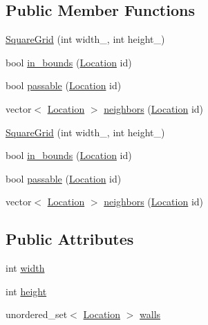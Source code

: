 \subsection*{Public Member Functions}
\begin{DoxyCompactItemize}
\item 
\mbox{\hyperlink{structSquareGrid_ae5debd1459b89aba9497f270f6d76d7b}{Square\+Grid}} (int width\+\_\+, int height\+\_\+)
\item 
bool \mbox{\hyperlink{structSquareGrid_a84bbaa9dad618228a2d6d3196254b86b}{in\+\_\+bounds}} (\mbox{\hyperlink{structSquareGrid_a2c9a2cbd3912aa48ac97289abc3f1c0f}{Location}} id)
\item 
bool \mbox{\hyperlink{structSquareGrid_a3f638b46510dd880823b1acac75c7b96}{passable}} (\mbox{\hyperlink{structSquareGrid_a2c9a2cbd3912aa48ac97289abc3f1c0f}{Location}} id)
\item 
vector$<$ \mbox{\hyperlink{structSquareGrid_a2c9a2cbd3912aa48ac97289abc3f1c0f}{Location}} $>$ \mbox{\hyperlink{structSquareGrid_a106d76702d8c4acb03883c477db28e3a}{neighbors}} (\mbox{\hyperlink{structSquareGrid_a2c9a2cbd3912aa48ac97289abc3f1c0f}{Location}} id)
\item 
\mbox{\hyperlink{structSquareGrid_ae5debd1459b89aba9497f270f6d76d7b}{Square\+Grid}} (int width\+\_\+, int height\+\_\+)
\item 
bool \mbox{\hyperlink{structSquareGrid_a84bbaa9dad618228a2d6d3196254b86b}{in\+\_\+bounds}} (\mbox{\hyperlink{structSquareGrid_a2c9a2cbd3912aa48ac97289abc3f1c0f}{Location}} id)
\item 
bool \mbox{\hyperlink{structSquareGrid_a3f638b46510dd880823b1acac75c7b96}{passable}} (\mbox{\hyperlink{structSquareGrid_a2c9a2cbd3912aa48ac97289abc3f1c0f}{Location}} id)
\item 
vector$<$ \mbox{\hyperlink{structSquareGrid_a2c9a2cbd3912aa48ac97289abc3f1c0f}{Location}} $>$ \mbox{\hyperlink{structSquareGrid_a106d76702d8c4acb03883c477db28e3a}{neighbors}} (\mbox{\hyperlink{structSquareGrid_a2c9a2cbd3912aa48ac97289abc3f1c0f}{Location}} id)
\end{DoxyCompactItemize}
\subsection*{Public Attributes}
\begin{DoxyCompactItemize}
\item 
int \mbox{\hyperlink{structSquareGrid_af5476cf49f0bb03d1e940adbc6e5febf}{width}}
\item 
int \mbox{\hyperlink{structSquareGrid_ad6b113fc3a49f5db5fbf9c8138e35634}{height}}
\item 
unordered\+\_\+set$<$ \mbox{\hyperlink{structSquareGrid_a2c9a2cbd3912aa48ac97289abc3f1c0f}{Location}} $>$ \mbox{\hyperlink{structSquareGrid_a1bc7e32bd195e42fd9685310d7ee65c5}{walls}}
\end{DoxyCompactItemize}
